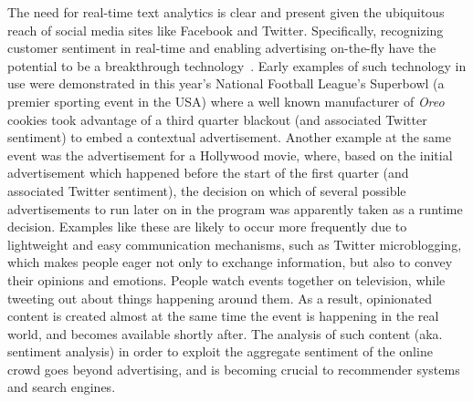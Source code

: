 \documentclass{sig-alternate}
\begin{document}
The need for real-time text analytics is clear and present given the ubiquitous reach of social media sites like Facebook and Twitter. Specifically, recognizing customer sentiment in real-time and enabling advertising on-the-fly have the potential to be a breakthrough technology~\cite{forbes}.
Early examples of such technology in use were demonstrated in this year's National Football League's Superbowl (a premier sporting event in the USA) where a well known manufacturer of {\em Oreo} cookies took advantage of a third quarter blackout (and associated Twitter sentiment) to embed a contextual advertisement. Another example at the same event was the advertisement for a Hollywood movie, where, based on the initial advertisement which happened before the start of the first quarter (and associated Twitter sentiment), the decision on which of several possible advertisements to run later on in the program was apparently taken as a runtime decision.
Examples like these are likely to occur more frequently due to
lightweight and easy communication mechanisms, such as Twitter microblogging, which makes people eager not only to exchange information, but also to convey their opinions and emotions. People watch events together on television, while tweeting out about things happening around them. As a result, opinionated content is created almost at the same time the event is happening in the real world, and becomes available shortly after.  The analysis of such content (aka. sentiment analysis) in order to exploit the aggregate sentiment of the online crowd goes beyond advertising, and is becoming crucial to recommender systems and search engines.
\end{document}
